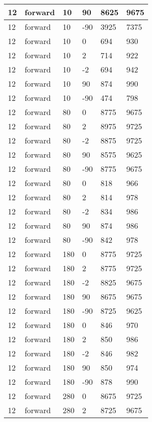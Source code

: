 \begin{table}
\begin{center}
\begin{tabular}{|l|l|l|l|l|l|}
			12 & forward & 10 & 90 & 8625 & 9675 \\
			\hline
			12 & forward & 10 & -90 & 3925 & 7375 \\
			\hline
			12 & forward & 10 & 0 & 694 & 930 \\
			\hline
			12 & forward & 10 & 2 & 714 & 922 \\
			\hline
			12 & forward & 10 & -2 & 694 & 942 \\
			\hline
			12 & forward & 10 & 90 & 874 & 990 \\
			\hline
			12 & forward & 10 & -90 & 474 & 798 \\
			\hline
			12 & forward & 80 & 0 & 8775 & 9675 \\
			\hline
			12 & forward & 80 & 2 & 8975 & 9725 \\
			\hline
			12 & forward & 80 & -2 & 8875 & 9725 \\
			\hline
			12 & forward & 80 & 90 & 8575 & 9625 \\
			\hline
			12 & forward & 80 & -90 & 8775 & 9675 \\
			\hline
			12 & forward & 80 & 0 & 818 & 966 \\
			\hline
			12 & forward & 80 & 2 & 814 & 978 \\
			\hline
			12 & forward & 80 & -2 & 834 & 986 \\
			\hline
			12 & forward & 80 & 90 & 874 & 986 \\
			\hline
			12 & forward & 80 & -90 & 842 & 978 \\
			\hline
			12 & forward & 180 & 0 & 8775 & 9725 \\
			\hline
			12 & forward & 180 & 2 & 8775 & 9725 \\
			\hline
			12 & forward & 180 & -2 & 8825 & 9675 \\
			\hline
			12 & forward & 180 & 90 & 8675 & 9675 \\
			\hline
			12 & forward & 180 & -90 & 8725 & 9625 \\
			\hline
			12 & forward & 180 & 0 & 846 & 970 \\
			\hline
			12 & forward & 180 & 2 & 850 & 986 \\
			\hline
			12 & forward & 180 & -2 & 846 & 982 \\
			\hline
			12 & forward & 180 & 90 & 850 & 974 \\
			\hline
			12 & forward & 180 & -90 & 878 & 990 \\
			\hline
			12 & forward & 280 & 0 & 8675 & 9725 \\
			\hline
			12 & forward & 280 & 2 & 8725 & 9675 \\

\end{tabular}
\end{center}
\end{table}
